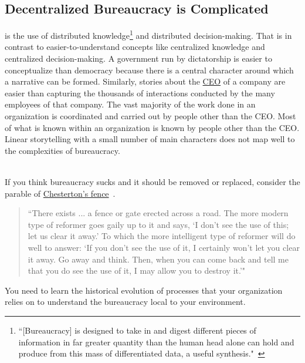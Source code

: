 \subsection*{Decentralized Bureaucracy is Complicated}

\iftoggle{glossarysubstitutionworks}{\Gls{decentralized bureaucracy}}{Decentralized bureaucracy}
is the use of distributed knowledge\footnote{``[Bureaucracy] is designed to take in and digest different pieces of information in far greater quantity than the human head alone can hold and produce from this mass of differentiated data, a useful synthesis."~\cite{1966_Morison}} 
and distributed decision-making. 
That is in contrast to easier-to-understand concepts like centralized knowledge and centralized decision-making. A government run by dictatorship is easier to conceptualize than democracy because there is a central character around which a narrative can be formed. Similarly, stories about the \href{https://en.wikipedia.org/wiki/Chief_executive_officer}{CEO}%
%
\iftoggle{WPinmargin}{\marginpar{$>$Wikipedia: Chief executive officer}}{ }%
of a company are easier than capturing the thousands of interactions conducted by the many employees of that company. The vast majority of the work done in an organization is coordinated and carried out by people other than the CEO. Most of what is known within an organization is known by people other than the CEO. Linear storytelling with a small number of main characters does not map well to the complexities of bureaucracy. 

\ \\

If you think bureaucracy sucks and it should be removed or replaced,  consider the parable of 
\href{https://en.wikipedia.org/wiki/G._K._Chesterton\%23Chesterton\%27s_fence}{Chesterton's fence}~\cite{1929_Chesterton}. 
\label{concept:chestertons_fence}
\iftoggle{WPinmargin}{\marginpar{$>$Wikipedia: Chesterton's fence}}{ }
\begin{quote}
``There exists ... a fence or gate erected across a road. The more modern type of reformer goes gaily up to it and says, `I don't see the use of this; let us clear it away.' To which the more intelligent type of reformer will do well to answer: `If you don't see the use of it, I certainly won't let you clear it away. Go away and think. Then, when you can come back and tell me that you do see the use of it, I may allow you to destroy it.'"
\end{quote}
You need to learn the historical evolution of processes that your organization relies on to understand the bureaucracy local to your environment.
